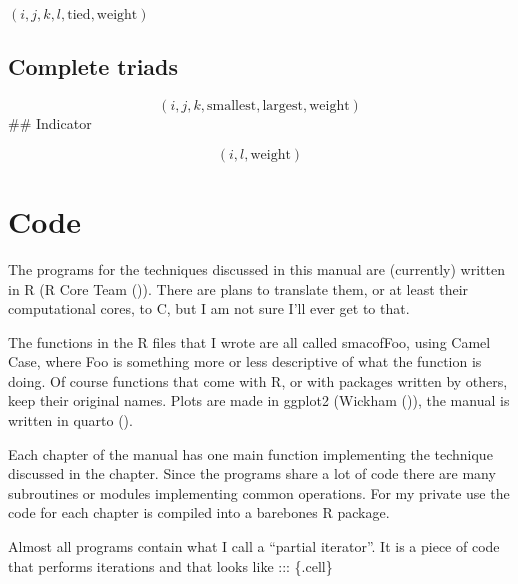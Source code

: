 \documentclass[
  12pt,
  letterpaper,
  DIV=11,
  numbers=noendperiod]{scrartcl}
\newcommand{\sectionbreak}{\clearpage}
\theoremstyle{plain}
\theoremstyle{remark}
\begin{document}
\((i, j, k, l, \text{tied}, \text{weight})\)

\subsection{Complete triads}\label{complete-triads}

\[(i, j, k, \text{smallest}, \text{largest}, \text{weight})\] \#\#
Indicator

\[(i, l, \text{weight})\]

\sectionbreak

\section{Code}\label{code}

The programs for the techniques discussed in this manual are (currently)
written in R (R Core Team ()). There
are plans to translate them, or at least their computational cores, to
C, but I am not sure I'll ever get to that.

The functions in the R files that I wrote are all called smacofFoo,
using Camel Case, where Foo is something more or less descriptive of
what the function is doing. Of course functions that come with R, or
with packages written by others, keep their original names. Plots are
made in ggplot2 (Wickham ()), the manual
is written in quarto ().

Each chapter of the manual has one main function implementing the
technique discussed in the chapter. Since the programs share a lot of
code there are many subroutines or modules implementing common
operations. For my private use the code for each chapter is compiled
into a barebones R package.

Almost all programs contain what I call a ``partial iterator''. It is a
piece of code that performs iterations and that looks like ::: \{.cell\}
\end{document}
